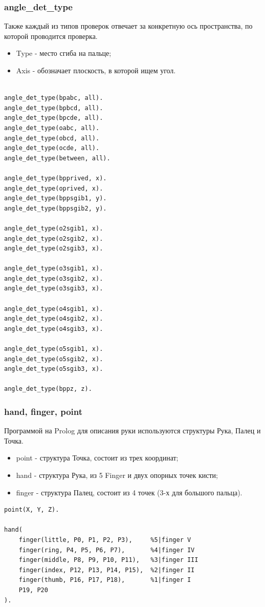 \subsubsection{angle\_det\_type}
\hspace{0.6cm} Также каждый из типов проверок отвечает за конкретную ось пространства, по которой проводится проверка.

\begin{itemize}
	\item Type - место сгиба на пальце;
	\item Axis - обозначает плоскость, в которой ищем угол.
\end{itemize}

\begin{lstlisting}[caption=Знания об осях типов проверок, label=list:angledettype]
%angle_det_type(Type, Axis)

angle_det_type(bpabc, all).
angle_det_type(bpbcd, all).
angle_det_type(bpcde, all).
angle_det_type(oabc, all).
angle_det_type(obcd, all).
angle_det_type(ocde, all).
angle_det_type(between, all).

angle_det_type(bpprived, x).
angle_det_type(oprived, x).
angle_det_type(bppsgib1, y).
angle_det_type(bppsgib2, y).

angle_det_type(o2sgib1, x).
angle_det_type(o2sgib2, x).
angle_det_type(o2sgib3, x).

angle_det_type(o3sgib1, x).
angle_det_type(o3sgib2, x).
angle_det_type(o3sgib3, x).

angle_det_type(o4sgib1, x).
angle_det_type(o4sgib2, x).
angle_det_type(o4sgib3, x).

angle_det_type(o5sgib1, x).
angle_det_type(o5sgib2, x).
angle_det_type(o5sgib3, x).

angle_det_type(bppz, z).
\end{lstlisting}

\subsubsection{hand, finger, point}
\hspace{0.6cm} Программой на Prolog для описания руки используются структуры Рука, Палец и Точка.

\begin{itemize}
	\item point - структура Точка, состоит из трех координат;
	\item hand - структура Рука, из 5 Finger и двух опорных точек кисти;
	\item finger - структура Палец, состоит из 4 точек (3-х для большого пальца).
\end{itemize}
\begin{lstlisting}[caption=Структуры, label=list:structures]
point(X, Y, Z).

hand(
	finger(little, P0, P1, P2, P3),		%5|finger V
	finger(ring, P4, P5, P6, P7),		%4|finger IV
	finger(middle, P8, P9, P10, P11),	%3|finger III
	finger(index, P12, P13, P14, P15),	%2|finger II
	finger(thumb, P16, P17, P18),		%1|finger I
	P19, P20							
).	
\end{lstlisting}

